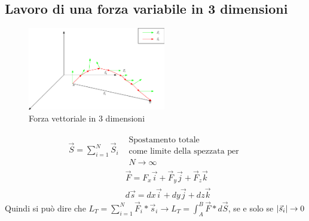 \subsection{Lavoro di una forza variabile in 3 dimensioni}
\begin{figure}[th]
    \centering
    \includegraphics[width=6cm]{img/finiti/forza_vet_3d.eps}
    \caption{Forza vettoriale in 3 dimensioni}
\end{figure}
\begin{eqnarray*}
	\vec{S}=\displaystyle\sum_{i=1}^{N}\vec{S}_i & \begin{matrix}
		\text{Spostamento totale}\\
		\text{come limite della spezzata per}\\
		N\to \infty
	\end{matrix}\\
	& \vec{F}=F_x\vec{i}+\vec{F}_y\vec{j}+\vec{F}_z\vec{k}\\
	& d\vec{s}=dx\vec{i}+dy\vec{j}+dz\vec{k}
\end{eqnarray*}
Quindi si può dire che $L_T=\displaystyle\sum_{i=1}^{N}\vec{F}_i*\vec{s}_i\to
L_T=\int_{A}^{B}\vec{F}*d\vec{S}$, se e solo se $\lvert\vec{s}_i\rvert\to 0$
